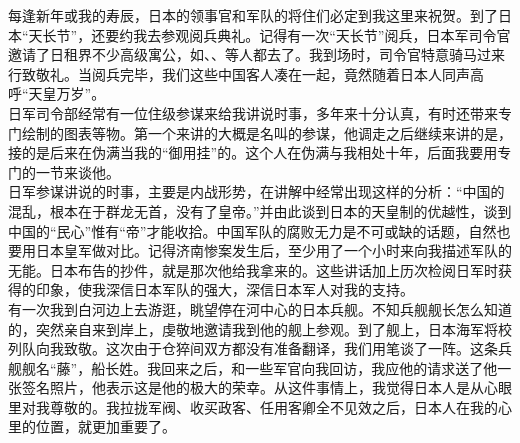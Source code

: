 每逢新年或我的寿辰，日本的领事官和军队的将住们必定到我这里来祝贺。到了日本“天长节”，还要约我去参观阅兵典礼。记得有一次“天长节”阅兵，日本军司令官邀请了日租界不少高级寓公，如、、等人都去了。我到场时，司令官特意骑马过来行致敬礼。当阅兵完毕，我们这些中国客人凑在一起，竟然随着日本人同声高呼“天皇万岁”。\\

日军司令部经常有一位住级参谋来给我讲说时事，多年来十分认真，有时还带来专门绘制的图表等物。第一个来讲的大概是名叫的参谋，他调走之后继续来讲的是，接的是后来在伪满当我的“御用挂”的。这个人在伪满与我相处十年，后面我要用专门的一节来谈他。\\

日军参谋讲说的时事，主要是内战形势，在讲解中经常出现这样的分析：“中国的混乱，根本在于群龙无首，没有了皇帝。”并由此谈到日本的天皇制的优越性，谈到中国的“民心”惟有“帝”才能收拾。中国军队的腐败无力是不可或缺的话题，自然也要用日本皇军做对比。记得济南惨案发生后，至少用了一个小时来向我描述军队的无能。日本布告的抄件，就是那次他给我拿来的。这些讲话加上历次检阅日军时获得的印象，使我深信日本军队的强大，深信日本军人对我的支持。\\

有一次我到白河边上去游逛，眺望停在河中心的日本兵舰。不知兵舰舰长怎么知道的，突然亲自来到岸上，虔敬地邀请我到他的舰上参观。到了舰上，日本海军将校列队向我致敬。这次由于仓猝间双方都没有准备翻译，我们用笔谈了一阵。这条兵舰舰名“藤”，船长姓。我回来之后，和一些军官向我回访，我应他的请求送了他一张签名照片，他表示这是他的极大的荣幸。从这件事情上，我觉得日本人是从心眼里对我尊敬的。我拉拢军阀、收买政客、任用客卿全不见效之后，日本人在我的心里的位置，就更加重要了。\\

